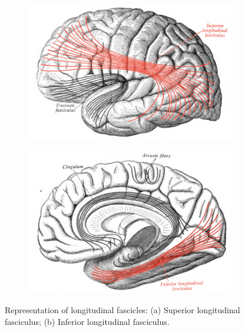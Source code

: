    \begin{figure}[h]
    \centering
    \begin{subfigure}{.5\textwidth}
      \centering
      \includegraphics[width=0.95\linewidth]{images/SLF.png}
      \caption{}
      \label{fig:SLF}
    \end{subfigure}%
    \begin{subfigure}{.5\textwidth}
      \centering
      \includegraphics[width=0.95\linewidth]{images/ILf.png}
      \caption{}
      \label{fig:ILF}
    \end{subfigure}
    \caption{Representation of longitudinal fascicles: (a) Superior longitudinal fasciculus; (b) Inferior longitudinal fasciculus. \cite{sobottaAtlas1908}}
 \end{figure}
  


